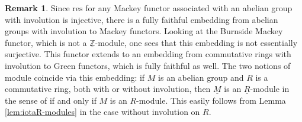 \documentclass[10pt]{amsart}
\theoremstyle{definition}
\newtheorem{rmk}[thm]{Remark}
\numberwithin{equation}{section}
\newcommand{\Z}{\mathbb{Z}}
\newcommand{\ul}{\underline}
\newcommand{\res}{\mathrm{res}}
\begin{document}
\begin{rmk}
Since $\res$ for any Mackey functor associated with an abelian group with involution is injective, there is a fully faithful embedding from abelian groups with involution to Mackey functors. Looking at the Burnside Mackey functor, which is not a $\ul{\Z}$-module, one sees that this embedding is not essentially surjective. This functor extends to an embedding from commutative rings with involution to Green functors, which is fully faithful as well. The two  notions of module coincide via this embedding:
if $M$ is an abelian group and $R$ is a commutative ring,  both with or without involution,
then $\ul{M}$ is an $\ul{R}$-module in the sense of \cite[pp.\ 62--63]{lewis88} if and only if $M$ is an $R$-module.
This easily follows from Lemma \ref{lem:iotaR-modules}
in the case without involution on $R$. 
\end{rmk}
\end{document}
